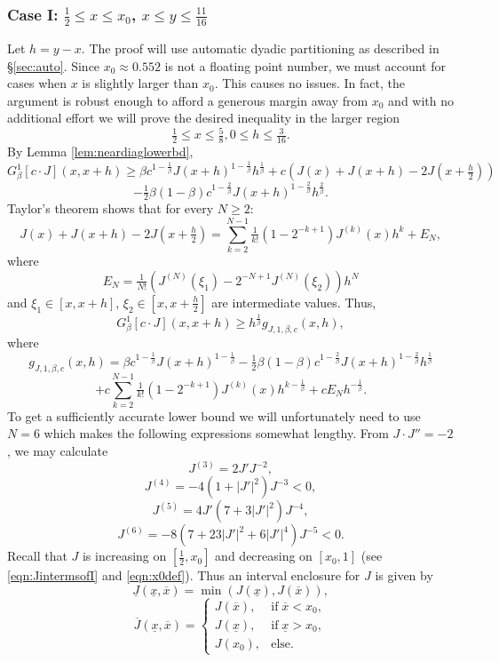 \documentclass[12pt]{amsart}
\theoremstyle{plain}
\theoremstyle{definition}
\theoremstyle{remark}
\numberwithin{equation}{section}
\begin{document}
\subsubsection{Case I: $\frac12\le x\le  x_0$, $x\le y\le \frac{11}{16}$}
\label{sec:J-I}
Let $h=y-x$. 
The proof will use automatic dyadic partitioning as described in \S \ref{sec:auto}.
Since $x_0\approx 0.552$ is not a floating point number, we must account for cases when $x$ is slightly larger than $x_0$. This causes no issues. In fact, the argument is robust enough to afford a generous margin away from $x_0$ and with no additional effort we will prove the desired inequality in the larger region
\[ \tfrac12\le x\le \tfrac58, 0\le h\le \tfrac{3}{16}. \]
By Lemma \ref{lem:neardiaglowerbd},
\[ G^1_\beta[c\cdot J](x,x+h)\ge \beta c^{1-\frac1\beta} J(x+h)^{1-\frac1\beta}h^{\frac1\beta} + c(J(x) + J(x+h)-2J(x+\tfrac{h}2)) \] 
\[- \tfrac12 \beta(1-\beta) c^{1-\frac2\beta} J(x+h)^{1-\frac2\beta}h^{\frac2\beta}. \]
Taylor's theorem shows that for every $N\ge 2$:
\[ J(x) + J(x+h)-2J(x+\tfrac{h}2) = \sum_{k=2}^{N-1} \tfrac1{k!}(1-2^{-k+1}) J^{(k)}(x)h^k + E_N, \]
where 
\[ E_N = \tfrac1{N!}(J^{(N)}(\xi_1)-2^{-N+1} J^{(N)}(\xi_2)) h^N \]
and $\xi_1\in [x,x+h]$, $\xi_2\in [x,x+\frac{h}2]$ are intermediate values.
Thus,
\[ G_\beta^1[c\cdot J](x,x+h)\ge h^{\frac1\beta} g_{J,1,\beta,c}(x,h), \]
where
\[ g_{J,1,\beta,c}(x,h)= \beta c^{1-\frac1\beta}J(x+h)^{1-\frac1\beta} - \tfrac12 \beta(1-\beta)c^{1-\frac2\beta}J(x+h)^{1-\frac2\beta}h^{\frac1\beta} \]  \[ +c \sum_{k=2}^{N-1} \tfrac1{k!}(1-2^{-k+1}) J^{(k)}(x)h^{k-\frac1\beta} + c E_N h^{-\frac1\beta}. \]
To get a sufficiently accurate lower bound we will unfortunately need to use $N=6$ which makes the following expressions somewhat lengthy. From $J\cdot J''=-2$, we may calculate
\[ J^{(3)}=2J' J^{-2},\]
\begin{equation}\label{eqn:D4J}
J^{(4)}=-4 (1+|J'|^2)J^{-3}<0,
\end{equation}
\[ J^{(5)}=4J'(7+3|J'|^2)J^{-4}, \]
\[ J^{(6)}=-8(7+23|J'|^2+6|J'|^4)J^{-5}<0. \]
Recall that $J$ is increasing on $[\frac12,x_0]$ and decreasing on $[x_0,1]$ (see \eqref{eqn:JintermsofI} and \eqref{eqn:x0def}).
Thus an interval enclosure for $J$ is given by
\begin{equation}\label{eqn:Jenclosure}
\underline{J}(\underline{x},\overline{x})=\min(J(\underline{x}),J(\overline{x})),
\end{equation}
\[ \overline{J}(\underline{x},\overline{x})=\left\{
\begin{array}{ll}
J(\overline{x}), & \text{if}\;\overline{x}<x_0,\\
J(\underline{x}), & \text{if}\;\underline{x}>x_0,\\
J(x_0), & \text{else}.
\end{array}
\right.\]
\end{document}

